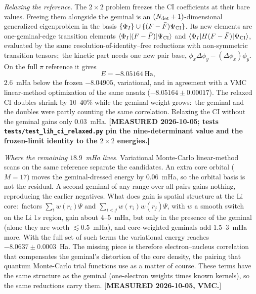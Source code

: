 \documentclass[aps,pra,twocolumn,superscriptaddress,longbibliography]{revtex4-2}
\begin{document}
\emph{Relaxing the reference.}  The $2\times2$ problem freezes the CI coefficients
at their bare values.  Freeing them alongside the geminal is an
$(N_{\rm det}+1)$-dimensional generalized eigenproblem in the basis
$\{\Phi_I\}\cup\{(F-\bar F)\Psi_{\rm CI}\}$.  Its new elements are one-geminal-edge
transition elements $\langle\Phi_I|(F-\bar F)|\Psi_{\rm CI}\rangle$ and
$\langle\Phi_I|H(F-\bar F)|\Psi_{\rm CI}\rangle$, evaluated by the same
resolution-of-identity--free reductions with non-symmetric transition tensors;\ the
kinetic part needs one new pair base, $\phi_x\Delta\phi_y-(\Delta\phi_x)\phi_y$.  On
the full $\pi$ reference it gives
\[
E = \mathbf{-8.05164}~\mathrm{Ha},
\]
$2.6$~mHa below the frozen $-8.04905$, variational, and in agreement with a VMC
linear-method optimization of the same ansatz ($-8.05164\pm0.00017$).  The relaxed
CI doubles shrink by $10$--$40\%$ while the geminal weight grows:\ the geminal and
the doubles were partly counting the same correlation.  Relaxing the CI without the
geminal gains only $0.03$~mHa.  \textbf{[MEASURED 2026-10-05; tests
\texttt{tests/test\_lih\_ci\_relaxed.py} pin the nine-determinant value and the
frozen-limit identity to the $2\times2$ energies.]}

\emph{Where the remaining $18.9$~mHa lives.}  Variational Monte-Carlo
linear-method scans on the same reference separate the candidates.  An extra core
orbital ($M=17$) moves the geminal-dressed energy by $0.06$~mHa, so the orbital basis
is not the residual.  A second geminal of any range over all pairs gains nothing,
reproducing the earlier negatives.  What does gain is spatial structure at the Li
core:\ factors $\sum_i w(r_i)\Psi$ and $\sum_{i<j}w(r_i)w(r_j)\Psi$, with $w$ a smooth
switch on the Li $1s$ region, gain about $4$--$5$~mHa, but only in the presence of
the geminal (alone they are worth $\lesssim0.5$~mHa), and core-weighted geminals add
$1.5$--$3$~mHa more.  With the full set of such terms the variational energy reaches
$-8.0637\pm0.0003$~Ha.  The missing piece is therefore electron--nucleus correlation
that compensates the geminal's distortion of the core density, the pairing that
quantum Monte-Carlo trial functions use as a matter of course.  These terms have the
same structure as the geminal (one-electron weights times known kernels), so the same
reductions carry them.  \textbf{[MEASURED 2026-10-05, VMC.]}
\end{document}
